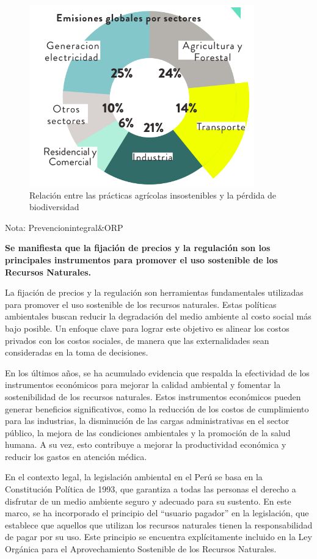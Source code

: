 \documentclass[
  a4paper,
]{article}
\begin{document}
\begin{figure}

\caption{\label{fig-2}Relación entre las prácticas agrícolas
insostenibles y la pérdida de biodiversidad}

{\centering \includegraphics{20230603083843.png}

}

\end{figure}

Nota: Prevencionintegral\&ORP

\textbf{Se manifiesta que la fijación de precios y la regulación son los
principales instrumentos para promover el uso sostenible de los Recursos
Naturales.}

La fijación de precios y la regulación son herramientas fundamentales
utilizadas para promover el uso sostenible de los recursos naturales.
Estas políticas ambientales buscan reducir la degradación del medio
ambiente al costo social más bajo posible. Un enfoque clave para lograr
este objetivo es alinear los costos privados con los costos sociales, de
manera que las externalidades sean consideradas en la toma de
decisiones.

En los últimos años, se ha acumulado evidencia que respalda la
efectividad de los instrumentos económicos para mejorar la calidad
ambiental y fomentar la sostenibilidad de los recursos naturales. Estos
instrumentos económicos pueden generar beneficios significativos, como
la reducción de los costos de cumplimiento para las industrias, la
disminución de las cargas administrativas en el sector público, la
mejora de las condiciones ambientales y la promoción de la salud humana.
A su vez, esto contribuye a mejorar la productividad económica y reducir
los gastos en atención médica.

En el contexto legal, la legislación ambiental en el Perú se basa en la
Constitución Política de 1993, que garantiza a todas las personas el
derecho a disfrutar de un medio ambiente seguro y adecuado para su
sustento. En este marco, se ha incorporado el principio del ``usuario
pagador'' en la legislación, que establece que aquellos que utilizan los
recursos naturales tienen la responsabilidad de pagar por su uso. Este
principio se encuentra explícitamente incluido en la Ley Orgánica para
el Aprovechamiento Sostenible de los Recursos Naturales.
\end{document}
